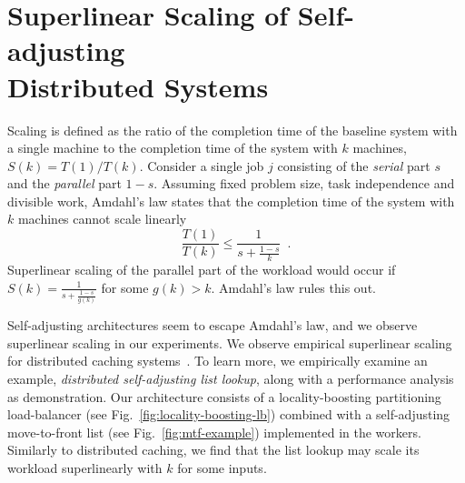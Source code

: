 \appendix






\section{Superlinear Scaling of Self-adjusting\\ Distributed Systems}
\label{sec:arch-scaling}


Scaling is defined as the ratio of the completion time of the baseline system with a single machine to the completion time of the system with $k$ machines, $S(k) = T(1) / T(k)$.
Consider a single job $j$ consisting of the \emph{serial} part $s$ and the \emph{parallel} part $1-s$.
Assuming fixed problem size, task independence and divisible work, Amdahl's law states that the completion time of the system with $k$ machines cannot scale linearly
\begin{equation*}\label{eq:mtf-perf}
  \frac{T(1)}{T(k)} \le \frac1{s + \frac{1-s}{k}} \enspace .
\end{equation*}
Superlinear scaling of the parallel part of the workload would occur if $S(k) = \frac1{s + \frac{1-s}{g(k)}}$ for some $g(k) > k$. Amdahl's law rules this out.


Self-adjusting architectures seem to escape Amdahl's law, and we observe superlinear scaling in our experiments.
We observe empirical superlinear scaling for distributed caching systems~\cite{271208, 10.5555/1012889.1012894, dobb-2}. To learn more, we empirically examine an example, \emph{distributed self-adjusting list lookup}, along with a performance analysis as demonstration. Our architecture consists of a locality-boosting partitioning load-balancer (see Fig.~\ref{fig:locality-boosting-lb}) combined with a self-adjusting move-to-front list (see Fig.~\ref{fig:mtf-example}) implemented in the workers.
Similarly to distributed caching, we find that the list lookup may scale its workload superlinearly with $k$ for some inputs.

